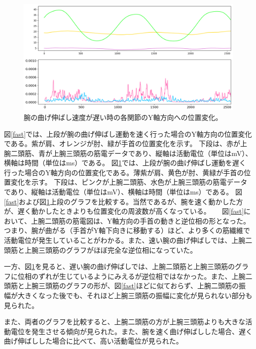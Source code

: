 \documentclass{jsarticle}
\begin{document}
\begin{figure}[!h]
	\begin{center}
		\includegraphics[width=17cm]{graph_image/slow_final.png}
		\caption{腕の曲げ伸ばし速度が遅い時の各関節のY軸方向への位置変化。}
		\label{slow}
	\end{center}
\end{figure}

図\ref{fast}では、上段が腕の曲げ伸ばし運動を速く行った場合のY軸方向の位置変化である。紫が肩、オレンジが肘、緑が手首の位置変化を示す。
下段は、赤が上腕二頭筋、青が上腕三頭筋の筋電データであり、縦軸は活動電位（単位はmV）、横軸は時間（単位はms）である。
図\ref{slow}では、上段が腕の曲げ伸ばし運動を遅く行った場合のY軸方向の位置変化である。薄紫が肩、黄色が肘、黄緑が手首の位置変化を示す。
下段は、ピンクが上腕二頭筋、水色が上腕三頭筋の筋電データであり、縦軸は活動電位（単位はmV）、横軸は時間（単位はms）である。
図\ref{fast}および図\ref{slow}上段のグラフを比較する。当然であるが、腕を速く動かした方が、遅く動かしたときよりも位置変化の周波数が高くなっている。
　
図\ref{fast}において、上腕二頭筋の筋電図は、Y軸方向の手首の動きと逆位相の形となった。つまり、腕が曲がる（手首がY軸下向きに移動する）ほど、より多くの筋繊維で活動電位が発生していることがわかる。また、速い腕の曲げ伸ばしでは、上腕二頭筋と上腕三頭筋のグラフがほぼ完全な逆位相になっていた。

一方、図\ref{slow}を見ると、遅い腕の曲げ伸ばしでは、上腕二頭筋と上腕三頭筋のグラフに位相のずれが生じているようにみえるが逆位相ではなかった。また、上腕二頭筋と上腕三頭筋のグラフの形が、図\ref{fast}ほどに似ておらず、上腕二頭筋の振幅が大きくなった後でも、それほど上腕三頭筋の振幅に変化が見られない部分も見られた。

また、両者のグラフを比較すると、上腕二頭筋の方が上腕三頭筋よりも大きな活動電位を発生させる傾向が見られた。また、腕を速く曲げ伸ばしした場合、遅く曲げ伸ばしした場合に比べて、高い活動電位が見られた。
\end{document}
